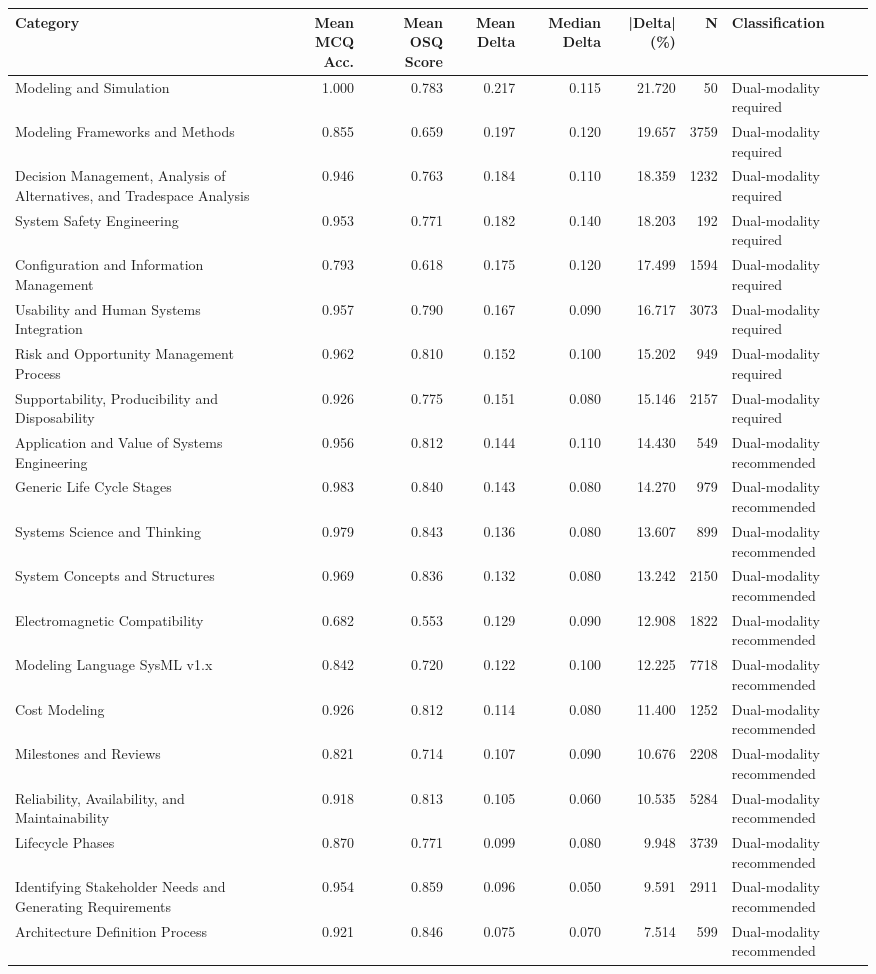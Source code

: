 \begin{tabular}{lrrrrrrl}
\toprule
Category & Mean MCQ Acc. & Mean OSQ Score & Mean Delta & Median Delta & |Delta| (\%) & N & Classification \\
\midrule
Modeling and Simulation & 1.000 & 0.783 & 0.217 & 0.115 & 21.720 & 50 & Dual-modality required \\
Modeling Frameworks and Methods & 0.855 & 0.659 & 0.197 & 0.120 & 19.657 & 3759 & Dual-modality required \\
Decision Management, Analysis of Alternatives, and Tradespace Analysis & 0.946 & 0.763 & 0.184 & 0.110 & 18.359 & 1232 & Dual-modality required \\
System Safety Engineering & 0.953 & 0.771 & 0.182 & 0.140 & 18.203 & 192 & Dual-modality required \\
Configuration and Information Management & 0.793 & 0.618 & 0.175 & 0.120 & 17.499 & 1594 & Dual-modality required \\
Usability and Human Systems Integration & 0.957 & 0.790 & 0.167 & 0.090 & 16.717 & 3073 & Dual-modality required \\
Risk and Opportunity Management Process & 0.962 & 0.810 & 0.152 & 0.100 & 15.202 & 949 & Dual-modality required \\
Supportability, Producibility and Disposability & 0.926 & 0.775 & 0.151 & 0.080 & 15.146 & 2157 & Dual-modality required \\
Application and Value of Systems Engineering & 0.956 & 0.812 & 0.144 & 0.110 & 14.430 & 549 & Dual-modality recommended \\
Generic Life Cycle Stages & 0.983 & 0.840 & 0.143 & 0.080 & 14.270 & 979 & Dual-modality recommended \\
Systems Science and Thinking & 0.979 & 0.843 & 0.136 & 0.080 & 13.607 & 899 & Dual-modality recommended \\
System Concepts and Structures & 0.969 & 0.836 & 0.132 & 0.080 & 13.242 & 2150 & Dual-modality recommended \\
Electromagnetic Compatibility & 0.682 & 0.553 & 0.129 & 0.090 & 12.908 & 1822 & Dual-modality recommended \\
Modeling Language SysML v1.x & 0.842 & 0.720 & 0.122 & 0.100 & 12.225 & 7718 & Dual-modality recommended \\
Cost Modeling & 0.926 & 0.812 & 0.114 & 0.080 & 11.400 & 1252 & Dual-modality recommended \\
Milestones and Reviews & 0.821 & 0.714 & 0.107 & 0.090 & 10.676 & 2208 & Dual-modality recommended \\
Reliability, Availability, and Maintainability & 0.918 & 0.813 & 0.105 & 0.060 & 10.535 & 5284 & Dual-modality recommended \\
Lifecycle Phases & 0.870 & 0.771 & 0.099 & 0.080 & 9.948 & 3739 & Dual-modality recommended \\
Identifying Stakeholder Needs and Generating Requirements & 0.954 & 0.859 & 0.096 & 0.050 & 9.591 & 2911 & Dual-modality recommended \\
Architecture Definition Process & 0.921 & 0.846 & 0.075 & 0.070 & 7.514 & 599 & Dual-modality recommended \\
\bottomrule
\end{tabular}

